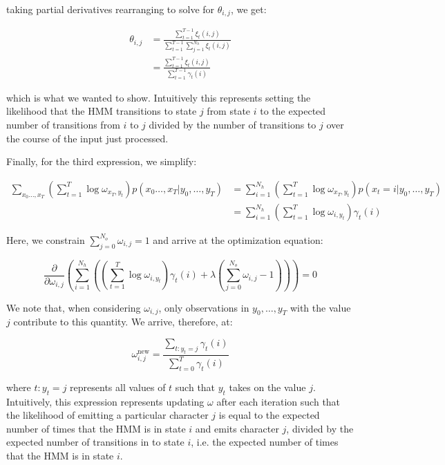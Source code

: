 \documentclass{article}
\begin{document}
\begin{enumerate}[(a)]
taking partial derivatives rearranging to solve for $\theta_{i, j}$, we
get:

\begin{align*}
\theta_{i, j} &= \frac {\sum_{t=1}^{T-1} \xi_t(i, j)}{\sum_{t=1}^{T-1} \sum_{j=1}^{N_h} \xi_t(i, j)}\\
&= \frac {\sum_{t=1}^{T-1} \xi_t(i, j)}{\sum_{t=1}^{T-1} \gamma_t(i)}
\end{align*}

which is what we wanted to show. Intuitively this represents setting
the likelihood that the HMM transitions to state $j$ from state $i$ to
the expected number of transitions from $i$ to $j$ divided by the
number of transitions to $j$ over the course of the input just
processed.

Finally, for the third expression, we simplify:

\begin{align*}
\sum_{x_0\dots,x_T} (\sum_{t=1}^T\log\omega_{x_T,y_t})p(x_0\dots,x_T | y_0,\dots,y_T) &= \sum_{i=1}^{N_h} (\sum_{t=1}^T\log\omega_{x_T,y_t})p(x_t = i| y_0,\dots,y_T)\\
&= \sum_{i=1}^{N_h} (\sum_{t=1}^T\log\omega_{i,y_t})\gamma_t(i)
\end{align*}


Here, we constrain $\sum_{j=0}^{N_o} \omega_{i, j} = 1$ and arrive at the
optimization equation:

\begin{equation*}
\frac \partial {\partial\omega_{i, j}} \left(\sum_{i=1}^{N_h} ((\sum_{t=1}^T\log\omega_{i,y_t})\gamma_t(i) + \lambda(\sum_{j=0}^{N_o} \omega_{i, j} - 1)) \right) = 0
\end{equation*}

We note that, when considering  $\omega_{i, j}$, only observations in
$y_0, \dots, y_T$ with the value $j$ contribute to this quantity. We
arrive, therefore, at:

\begin{equation*}
\omega^{\text{new}}_{i, j} = \frac {\sum_{t : y_t = j} \gamma_t(i)} {\sum_{t=0}^T \gamma_t(i)}
\end{equation*}

where $t : y_t = j$ represents all values of $t$ such that $y_t$ takes
on the value $j$. Intuitively, this expression represents updating $\omega$
after each iteration such that the likelihood of emitting a particular
character $j$ is equal to the expected number of times that the HMM is
in state $i$ and emits character $j$, divided by the expected number
of transitions in to state $i$, i.e. the expected number of times that
the HMM is in state $i$.


\end{enumerate}
\end{document}
